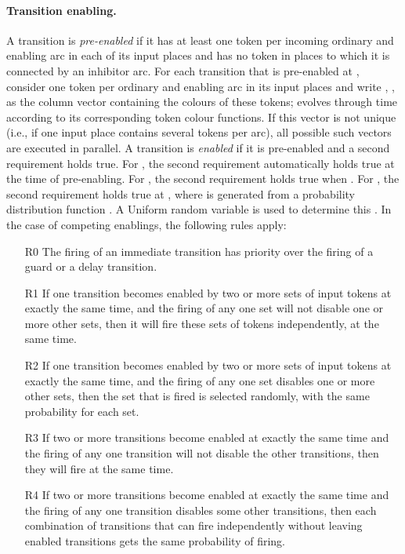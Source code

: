 \documentclass[copyright,creativecommons]{eptcs}
\begin{document}
\paragraph{Transition enabling.}
A transition  is {\em pre-enabled} if it has at least one
token per incoming ordinary and enabling arc in each of its input
places and has no token in places to which it is connected by an
inhibitor arc. For each transition  that is pre-enabled at
, consider one token per ordinary and enabling arc in its
input places and write , , as the column vector
containing the colours of these tokens;  evolves
through time according to its corresponding token colour functions.
If this vector is not unique
(i.e., if one input place contains several tokens per arc),
all possible such vectors are executed in parallel.
A transition  is {\em enabled} if it
is pre-enabled and a second requirement holds true. For , the second requirement automatically holds true at
the time of pre-enabling. For , the second
requirement holds true when .
For , the second requirement holds true
at , where  is
generated from a probability distribution function
.
A Uniform random variable  is used to determine this
.
In the case of competing enablings, the following
rules apply:
\begin{itemize}
\item[R0] The firing of an immediate transition has priority
over the firing of a guard or a delay transition.

\item[R1] If one transition becomes enabled by two or more sets
of input tokens at exactly the same time, and the firing of any
one set will not disable one or more other sets, then it will fire
these sets of tokens independently, at the same time.

\item[R2] If one transition becomes enabled by two or more sets
of input tokens at exactly the same time, and the firing of any
one set disables one or more other sets, then the set that is
fired is selected randomly, with the same probability for each
set.

\item[R3] If two or more transitions become enabled at exactly
the same time and the firing of any one transition will not
disable the other transitions, then they will fire at the same
time.

\item[R4] If two or more transitions become enabled at
exactly the same time and the firing of any one transition disables
some other transitions, then each combination of
transitions that can fire independently without leaving enabled
transitions gets the same probability of firing.

\end{itemize}
\end{document}
